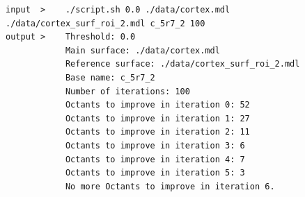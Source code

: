 \begin{lstlisting}[style=Console,caption={Output de ejecución algoritmo propuesto en malla de corteza cerebral con zona a refinar en lóbulo occipital.\\ Fuente: Elaboración propia.},label={out:cortex_2}]
input  >    ./script.sh 0.0 ./data/cortex.mdl ./data/cortex_surf_roi_2.mdl c_5r7_2 100
output >    Threshold: 0.0
            Main surface: ./data/cortex.mdl
            Reference surface: ./data/cortex_surf_roi_2.mdl
            Base name: c_5r7_2
            Number of iterations: 100
            Octants to improve in iteration 0: 52
            Octants to improve in iteration 1: 27
            Octants to improve in iteration 2: 11
            Octants to improve in iteration 3: 6
            Octants to improve in iteration 4: 7
            Octants to improve in iteration 5: 3
            No more Octants to improve in iteration 6.
\end{lstlisting}

